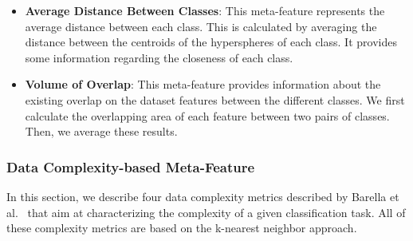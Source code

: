 \documentclass{article}
\begin{document}
\begin{itemize}
     \item \textbf{Average Distance Between Classes}:
     This meta-feature represents the average distance between each class. This is calculated by averaging the distance between the centroids of the hyperspheres of each class. It provides some information regarding the closeness of each class.
     
     \item \textbf{Volume of Overlap}:
     This meta-feature provides information about the existing overlap on the dataset features between the different classes. We first calculate the overlapping area of each feature between two pairs of classes. Then, we average these results. 
\end{itemize}


\subsubsection{Data Complexity-based Meta-Feature}
In this section, we describe four data complexity metrics described by Barella et al.~\cite{barellaAssessingDataComplexity2021} that aim at characterizing the complexity of a given classification task. All of these complexity metrics are based on the k-nearest neighbor approach.
\end{document}
